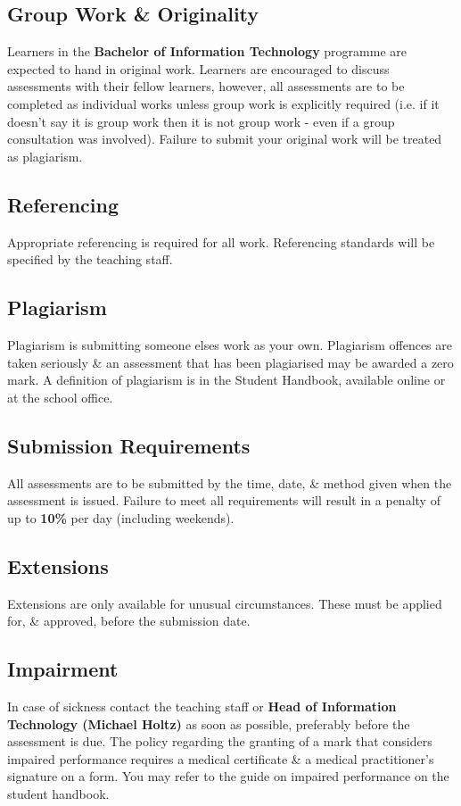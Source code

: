 \documentclass{article}
\begin{document}
\subsection*{Group Work \& Originality}
Learners in the \textbf{Bachelor of Information Technology} programme are expected to hand in original work. Learners are encouraged to discuss assessments with their fellow learners, however, all assessments are to be completed as individual works unless group work is explicitly required (i.e. if it doesn't say it is group work then it is not group work - even if a group consultation was involved). Failure to submit your original work will be treated as plagiarism.

\subsection*{Referencing}
Appropriate referencing is required for all work. Referencing standards will be specified by the teaching staff.

\subsection*{Plagiarism}
Plagiarism is submitting someone elses work as your own. Plagiarism offences are taken seriously \& an assessment that has been plagiarised may be awarded a zero mark. A definition of plagiarism is in the Student Handbook, available online or at the school office.

\subsection*{Submission Requirements}
All assessments are to be submitted by the time, date, \& method given when the assessment is issued. Failure to meet all requirements will result in a penalty of up to \textbf{10\%} per day (including weekends).

\subsection*{Extensions}
Extensions are only available for unusual circumstances. These must be applied for, \& approved, before the submission date.

\subsection*{Impairment}
In case of sickness contact the teaching staff or \textbf{Head of Information Technology (Michael Holtz)} as soon as possible, preferably before the assessment is due. The policy regarding the granting of a mark that considers impaired performance requires a medical certificate \& a medical practitioner’s signature on a form. You may refer to the guide on impaired performance on the student handbook.
\end{document}

